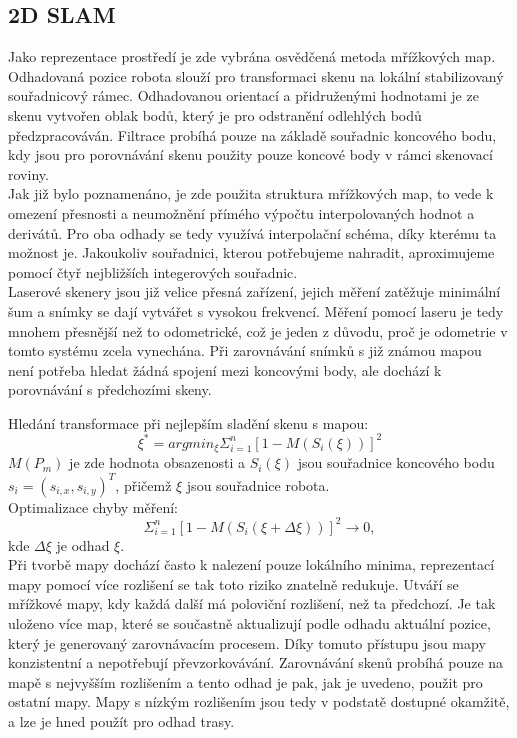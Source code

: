 \documentclass[12pt]{article}
\begin{document}
\subsection{2D SLAM}
Jako reprezentace prostředí je zde vybrána osvědčená metoda mřížkových map. Odhadovaná pozice robota slouží pro transformaci skenu na lokální stabilizovaný souřadnicový rámec. Odhadovanou orientací a přidruženými hodnotami je ze skenu vytvořen oblak bodů, který je pro odstranění odlehlých bodů předzpracováván. Filtrace probíhá pouze na základě souřadnic koncového bodu, kdy jsou pro porovnávání skenu použity pouze koncové body v rámci skenovací roviny.\\
\indent Jak již bylo poznamenáno, je zde použita struktura mřížkových map, to vede k omezení přesnosti a neumožnění přímého výpočtu interpolovaných hodnot a derivátů. Pro oba odhady se tedy využívá interpolační schéma, díky kterému ta možnost je. Jakoukoliv souřadnici, kterou potřebujeme nahradit, aproximujeme pomocí čtyř nejbližších integerových souřadnic. \\
\indent Laserové skenery jsou již velice přesná zařízení, jejich měření zatěžuje minimální šum a snímky se dají vytvářet s vysokou frekvencí. Měření pomocí laseru je tedy mnohem přesnější než to odometrické, což je jeden z důvodu, proč je odometrie v tomto systému zcela vynechána. Při zarovnávání snímků s již známou mapou není potřeba hledat žádná spojení mezi koncovými body, ale dochází k porovnávání s předchozími skeny.  

Hledání transformace při nejlepším sladění skenu s mapou:
\begin{equation}
	\xi^*=argmin_\xi\Sigma_{i=1}^n[1-M(S_i(\xi))]^2
\end{equation}
$M(P_m)$ je zde hodnota obsazenosti a $S_i(\xi)$ jsou souřadnice koncového bodu $s_i=(s_{i,x},s_{i,y})^T$, přičemž $\xi$ jsou souřadnice robota.\\
 
Optimalizace chyby měření: 
\begin{equation}
	\Sigma_{i=1}^n[1-M(S_i(\xi+\Delta\xi))]^2\rightarrow 0,
\end{equation}
kde $\Delta\xi$ je odhad $\xi$.\\
\indent Při tvorbě mapy dochází často k nalezení pouze lokálního minima, reprezentací mapy pomocí více rozlišení se tak toto riziko znatelně redukuje. Utváří se mřížkové mapy, kdy každá další má poloviční rozlišení, než ta předchozí. Je tak uloženo více map, které se součastně aktualizují podle odhadu aktuální pozice, který je generovaný zarovnávacím procesem. Díky tomuto přístupu jsou mapy konzistentní a nepotřebují převzorkovávání. Zarovnávání skenů probíhá pouze na mapě s nejvyšším rozlišením a tento odhad je pak, jak je uvedeno, použit pro ostatní mapy. Mapy s nízkým rozlišením jsou tedy v podstatě dostupné okamžitě, a lze je hned použít pro odhad trasy. 
\end{document}

